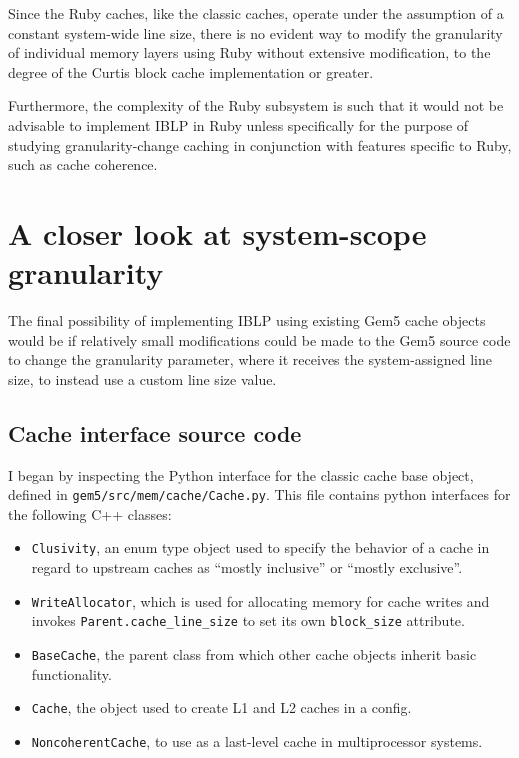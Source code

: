 \documentclass[12pt,twoside]{reedthesis}
\begin{document}
	Since the Ruby caches, like the classic caches, operate under the assumption of a constant system-wide line size, there is no evident way to modify the granularity of individual memory layers using Ruby without extensive modification, to the degree of the Curtis block cache implementation or greater.

	Furthermore, the complexity of the Ruby subsystem is such that it would not be advisable to implement IBLP in Ruby unless specifically for the purpose of studying granularity-change caching in conjunction with features specific to Ruby, such as cache coherence.

\section{A closer look at system-scope granularity}

	The final possibility of implementing IBLP using existing Gem5 cache objects would be if relatively small modifications could be made to the Gem5 source code to change the granularity parameter, where it receives the system-assigned line size, to instead use a custom line size value.

	\subsection*{Cache interface source code}

	I began by inspecting the Python interface for the classic cache base object, defined in \verb`gem5/src/mem/cache/Cache.py`. This file contains python interfaces for the following C++ classes:
	\begin{itemize}
		\item \verb`Clusivity`, an enum type object used to specify the behavior of a cache in regard to upstream caches as ``mostly inclusive'' or ``mostly exclusive''.
		\item \verb`WriteAllocator`, which is used for allocating memory for cache writes and invokes \verb`Parent.cache_line_size` to set its own \verb`block_size` attribute.
		\item \verb`BaseCache`, the parent class from which other cache objects inherit basic functionality.
		\item \verb`Cache`, the object used to create L1 and L2 caches in a config.
		\item \verb`NoncoherentCache`, to use as a last-level cache in multiprocessor systems.
	\end{itemize}
\end{document}
